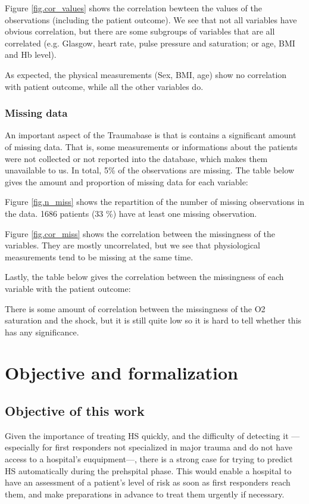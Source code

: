 Figure \ref{fig.cor_values} shows the correlation bewteen the values of the observations (including the patient outcome). We see that not all variables have obvious correlation, but there are some subgroups of variables that are all correlated (e.g. Glasgow, heart rate, pulse pressure and saturation; or age, BMI and Hb level). 

As expected, the physical measurements (Sex, BMI, age) show no correlation with patient outcome, while all the other variables do. 



			\subsubsection{Missing data}
			
An important aspect of the Traumabase is that is contains a significant amount of missing data. That is, some measurements or informations about the patients were not collected or not reported into the database, which makes them unavailable to us. In total, 5\% of the observations are missing. The table below gives the amount and proportion of missing data for each variable:



Figure \ref{fig.n_miss} shows the repartition of the number of missing observations in the data. 1686 patients (33 \%) have at least one missing observation.


			
Figure \ref{fig.cor_miss} shows the correlation between the missingness of the variables. They are mostly uncorrelated, but we see that physiological measurements tend to be missing at the same time.



Lastly, the table below gives the correlation between the missingness of each variable with the patient outcome:



There is some amount of correlation between the missingness of the O2 saturation and the shock, but it is still quite low so it is hard to tell whether this has any significance.

	\section{Objective and formalization}
		\subsection{Objective of this work}
Given the importance of treating HS quickly, and the difficulty of detecting it --- especially for first responders not specialized in major trauma and do not have access to a hospital's euquipment---, there is a strong case for trying to predict HS automatically during the prehspital phase. This would enable a hospital to have an assessment of a patient's level of risk as soon as first responders reach them, and make preparations in advance to treat them urgently if necessary.
		
